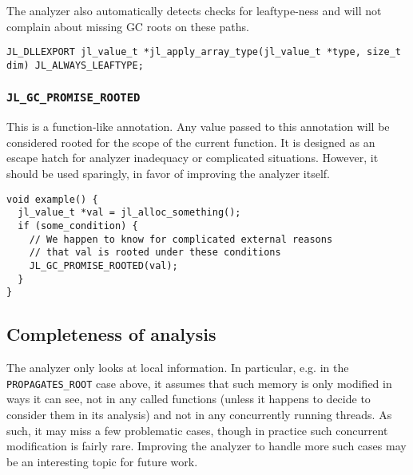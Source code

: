 The analyzer also automatically detects checks for leaftype-ness and will not complain about missing GC roots on these paths.




\begin{lstlisting}
JL_DLLEXPORT jl_value_t *jl_apply_array_type(jl_value_t *type, size_t dim) JL_ALWAYS_LEAFTYPE;
\end{lstlisting}



\hypertarget{15063650179417682020}{}


\subsubsection{\texttt{JL\_GC\_PROMISE\_ROOTED}}



This is a function-like annotation. Any value passed to this annotation will be considered rooted for the scope of the current function. It is designed as an escape hatch for analyzer inadequacy or complicated situations. However, it should be used sparingly, in favor of improving the analyzer itself.




\begin{lstlisting}
void example() {
  jl_value_t *val = jl_alloc_something();
  if (some_condition) {
    // We happen to know for complicated external reasons
    // that val is rooted under these conditions
    JL_GC_PROMISE_ROOTED(val);
  }
}
\end{lstlisting}



\hypertarget{18107261293830917313}{}


\subsection{Completeness of analysis}



The analyzer only looks at local information. In particular, e.g. in the \texttt{PROPAGATES\_ROOT} case above, it assumes that such memory is only modified in ways it can see, not in any called functions (unless it happens to decide to consider them in its analysis) and not in any concurrently running threads. As such, it may miss a few problematic cases, though in practice such concurrent modification is fairly rare. Improving the analyzer to handle more such cases may be an interesting topic for future work.



